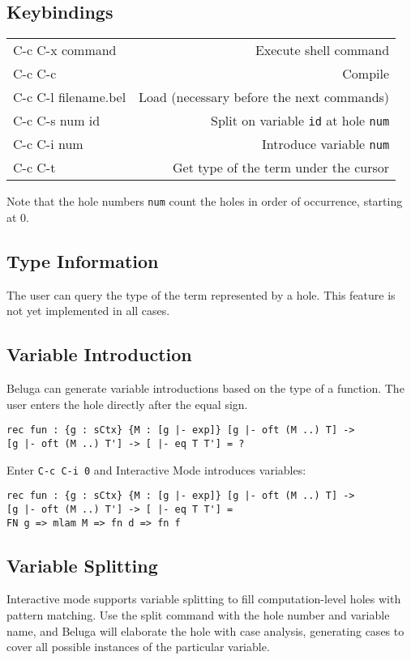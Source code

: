 \documentclass[11pt]{article}
\begin{document}
\subsection{Keybindings}

\begin{tabular}{ l r }
C-c C-x command & Execute shell command \\
C-c C-c & Compile \\
C-c C-l filename.bel & Load (necessary before the next commands) \\
C-c C-s num id & Split on variable \texttt{id} at hole \texttt{num} \\
C-c C-i num & Introduce variable \texttt{num} \\
C-c C-t & Get type of the term under the cursor \\
\end{tabular}

Note that the hole numbers \texttt{num} count the holes in order of occurrence, starting at 0.

\subsection{Type Information}
The user can query the type of the term represented by a hole. This feature is not yet implemented in all cases.

\subsection{Variable Introduction}
Beluga can generate variable introductions based on the type of a function. The user enters the hole directly after the equal sign. 
\begin{verbatim}
rec fun : {g : sCtx} {M : [g |- exp]} [g |- oft (M ..) T] -> 
[g |- oft (M ..) T'] -> [ |- eq T T'] = ?
\end{verbatim}

Enter \texttt{C-c C-i 0} and Interactive Mode introduces variables:
\begin{verbatim}
rec fun : {g : sCtx} {M : [g |- exp]} [g |- oft (M ..) T] -> 
[g |- oft (M ..) T'] -> [ |- eq T T'] =
FN g => mlam M => fn d => fn f
\end{verbatim}


\subsection{Variable Splitting}
Interactive mode supports variable splitting to fill computation-level holes with pattern matching. Use the split command with the hole number and variable name, and Beluga will elaborate the hole with case analysis, generating cases to cover all possible instances of the particular variable. 
\end{document}
